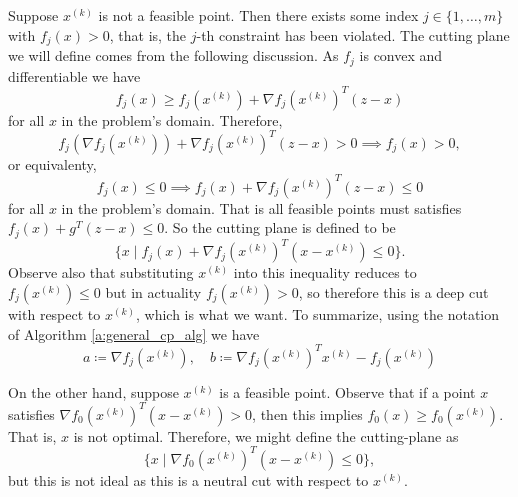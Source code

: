 \documentclass[11pt]{amsart}
\theoremstyle{definition}
\theoremstyle{remark}
\newcommand{\transpose}{T}
\begin{document}
        Suppose $x^{(k)}$ is not a feasible point. Then there exists some index $j \in \{1, \dots, m\}$ with $f_j(x) > 0$, that is, the $j$-th constraint has been violated. The cutting plane we will define comes from the following discussion. As $f_j$ is convex and differentiable we have
        \begin{equation*}
            f_j(x) \geq f_j(x^{(k)}) + \nabla f_j(x^{(k)})^\transpose(z-x)
        \end{equation*}
        for all $x$ in the problem's domain. Therefore,
        \begin{equation*}
            f_j(\nabla f_j(x^{(k)})) + \nabla f_j(x^{(k)})^\transpose(z-x) > 0 \implies f_j(x) > 0,
        \end{equation*}
        or equivalenty,
        \begin{equation*}
            f_j(x) \leq 0 \implies f_j(x) + \nabla f_j(x^{(k)})^\transpose(z-x) \leq 0
        \end{equation*}
        for all $x$ in the problem's domain. That is all feasible points must satisfies $f_j(x) + g^\transpose(z-x) \leq 0$. So the cutting plane is defined to be
        \begin{equation*}
            \{x \;|\; f_j(x) + \nabla f_j(x^{(k)})^\transpose(x-x^{(k)}) \leq 0\}.
        \end{equation*}
        Observe also that substituting $x^{(k)}$ into this inequality reduces to $f_j(x^{(k)}) \leq 0$ but in actuality $f_j(x^{(k)}) > 0$, so therefore this is a deep cut with respect to $x^{(k)}$, which is what we want. To summarize, using the notation of Algorithm \ref{a:general_cp_alg} we have
        \begin{equation}
            a \coloneqq \nabla f_j(x^{(k)}), \quad b \coloneqq \nabla f_j(x^{(k)})^\transpose x^{(k)} - f_j(x^{(k)})
        \end{equation}

        On the other hand, suppose $x^{(k)}$ is a feasible point. Observe that if a point $x$ satisfies $\nabla f_0(x^{(k)})^\transpose(x-x^{(k)}) > 0$, then this implies $f_0(x) \geq f_0(x^{(k)})$. That is, $x$ is not optimal. Therefore, we might define the cutting-plane as 
        \begin{equation*}
            \{x \;|\; \nabla f_0(x^{(k)})^\transpose(x-x^{(k)}) \leq 0\},
        \end{equation*}
        but this is not ideal as this is a neutral cut with respect to $x^{(k)}$. 
\end{document}
